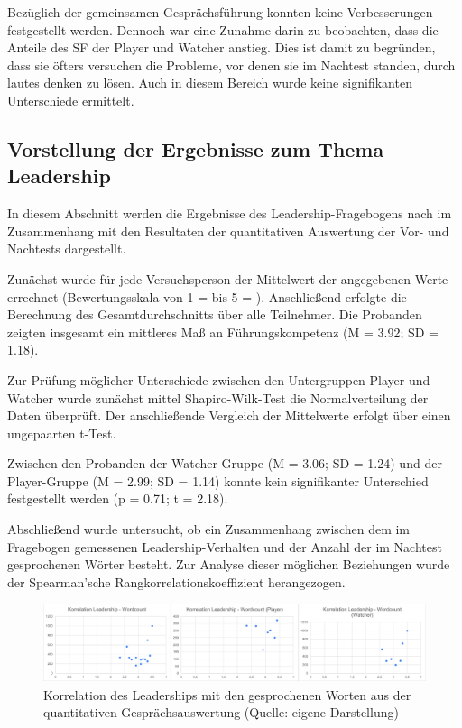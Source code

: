 Bezüglich der gemeinsamen Gesprächsführung konnten keine Verbesserungen festgestellt werden. Dennoch war eine Zunahme darin zu beobachten, dass die Anteile des \ac{SF} der Player und Watcher anstieg. Dies ist damit zu begründen, dass sie öfters versuchen die Probleme, vor denen sie im Nachtest standen, durch lautes denken zu lösen. Auch in diesem Bereich wurde keine signifikanten Unterschiede ermittelt.


\subsection{Vorstellung der Ergebnisse zum Thema Leadership}

In diesem Abschnitt werden die Ergebnisse des Leadership-Fragebogens nach \cite{emmerich_game_2016} im Zusammenhang mit den Resultaten der quantitativen Auswertung der Vor- und Nachtests dargestellt.

Zunächst wurde für jede Versuchsperson der Mittelwert der angegebenen Werte errechnet (Bewertungsskala von 1 =  bis 5 = ). Anschließend erfolgte die Berechnung des Gesamtdurchschnitts über alle Teilnehmer. Die Probanden zeigten insgesamt ein mittleres Maß an Führungskompetenz (M = 3.92; SD = 1.18). 

Zur Prüfung möglicher Unterschiede zwischen den Untergruppen Player und Watcher wurde zunächst mittel Shapiro-Wilk-Test die Normalverteilung der Daten überprüft. Der anschließende Vergleich der Mittelwerte erfolgt über einen ungepaarten t-Test.

Zwischen den Probanden der Watcher-Gruppe (M = 3.06; SD = 1.24) und der Player-Gruppe (M = 2.99; SD = 1.14) konnte kein signifikanter Unterschied festgestellt werden (p = 0.71; t = 2.18).

Abschließend wurde untersucht, ob ein Zusammenhang zwischen dem im Fragebogen gemessenen Leadership-Verhalten und der Anzahl der im Nachtest gesprochenen Wörter besteht. Zur Analyse dieser möglichen Beziehungen wurde der  Spearman'sche Rangkorrelationskoeffizient herangezogen.

\begin{figure}[ht]
\centering
\includegraphics[width=1\linewidth]{content/pictures/Korrelation_Leadership_Wordcount_full.png}
\caption{Korrelation des Leaderships mit den gesprochenen Worten aus der quantitativen Gesprächsauswertung (Quelle: eigene Darstellung)}
\label{fig:correlation_leadership_wordcount}
\end{figure}

